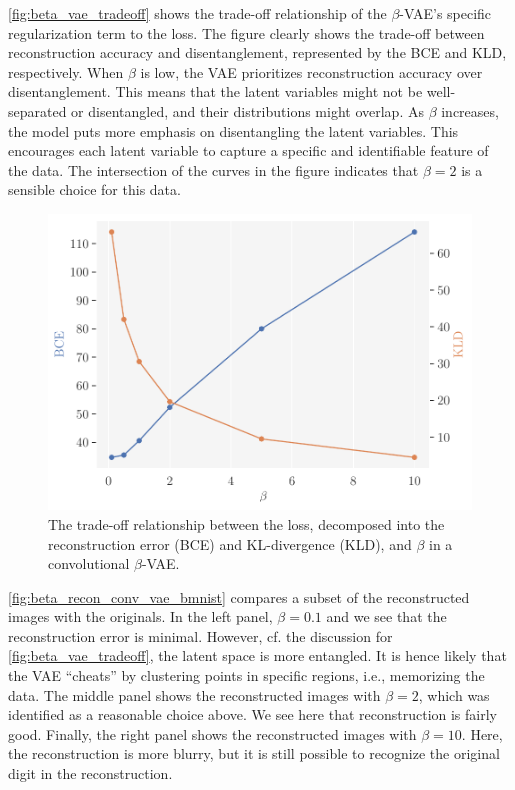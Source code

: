 \autoref{fig:beta_vae_tradeoff} shows the trade-off relationship of the $\beta$-VAE's specific regularization term to the loss. The figure clearly shows the trade-off between reconstruction accuracy and disentanglement, represented by the BCE and KLD, respectively. When $\beta$ is low, the VAE prioritizes reconstruction accuracy over disentanglement. This means that the latent variables might not be well-separated or disentangled, and their distributions might overlap. As $\beta$ increases, the model puts more emphasis on disentangling the latent variables. This encourages each latent variable to capture a specific and identifiable feature of the data. The intersection of the curves in the figure indicates that $\beta=2$ is a sensible choice for this data.

\begin{figure}[!htb]
\begin{center}\includegraphics[scale=0.75]{latex/figures/bce_kld_vs_beta.pdf}
\end{center}
\caption{The trade-off relationship between the loss, decomposed into the reconstruction error (BCE) and KL-divergence (KLD), and $\beta$ in a convolutional $\beta$-VAE.}
\label{fig:beta_vae_tradeoff}
\end{figure}

\autoref{fig:beta_recon_conv_vae_bmnist} compares a subset of the reconstructed images with the originals. In the left panel, $\beta=0.1$ and we see that the reconstruction error is minimal. However, cf. the discussion for \autoref{fig:beta_vae_tradeoff}, the latent space is more entangled. It is hence likely that the VAE “cheats” by clustering points in specific regions, i.e., memorizing the data. The middle panel shows the reconstructed images with $\beta=2$, which was identified as a reasonable choice above. We see here that reconstruction is fairly good. Finally, the right panel shows the reconstructed images with $\beta=10$. Here, the reconstruction is more blurry, but it is still possible to recognize the original digit in the reconstruction.

